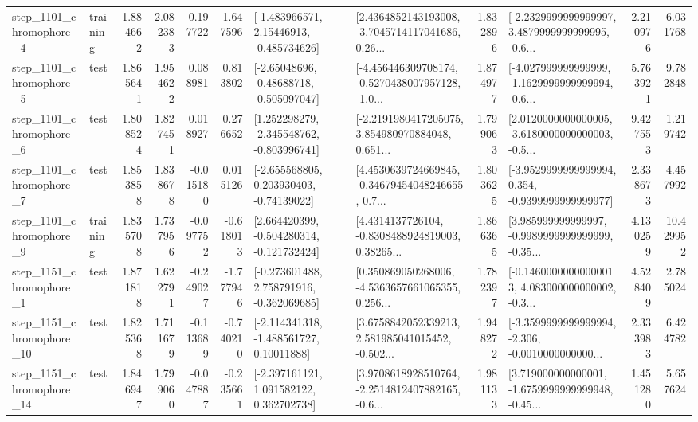 \begin{tabular}{llrrrrllrlrr}
  step\_1101\_chromophore\_4 &  training &      1.884662 &    2.082383 &      0.197722 &  1.647596 &    [-1.483966571, 2.15446913, -0.485734626] &  [2.4364852143193008, -3.7045714117041686, 0.26... &       1.832896 &  [-2.2329999999999997, 3.4879999999999995, -0.6... &            2.210976 &          6.031768 \\
  step\_1101\_chromophore\_5 &      test &      1.865641 &    1.954622 &      0.088981 &  0.813802 &    [-2.65048696, -0.48688718, -0.505097047] &  [-4.456446309708174, -0.5270438007957128, -1.0... &       1.874977 &  [-4.027999999999999, -1.1629999999999994, -0.6... &            5.763921 &          9.782848 \\
  step\_1101\_chromophore\_6 &      test &      1.808524 &    1.827451 &      0.018927 &  0.276652 &   [1.252298279, -2.345548762, -0.803996741] &  [-2.2191980417205075, 3.854980970884048, 0.651... &       1.799063 &  [2.0120000000000005, -3.6180000000000003, -0.5... &            9.427553 &          1.219742 \\
  step\_1101\_chromophore\_7 &      test &      1.853858 &    1.838678 &     -0.015180 &  0.015126 &    [-2.655568805, 0.203930403, -0.74139022] &  [4.4530639724669845, -0.34679454048246655, 0.7... &       1.803625 &  [-3.9529999999999994, 0.354, -0.9399999999999977] &            2.338673 &          4.457992 \\
  step\_1101\_chromophore\_9 &  training &      1.835708 &    1.737956 &     -0.097752 & -0.618013 &   [2.664420399, -0.504280314, -0.121732424] &  [4.4314137726104, -0.8308488924819003, 0.38265... &       1.866365 &  [3.985999999999997, -0.9989999999999999, -0.35... &            4.130259 &         10.429952 \\
  step\_1151\_chromophore\_1 &      test &      1.871818 &    1.622791 &     -0.249027 & -1.777946 &   [-0.273601488, 2.758791916, -0.362069685] &  [0.350869050268006, -4.5363657661065355, 0.256... &       1.782397 &  [-0.14600000000000013, 4.083000000000002, -0.3... &            4.528409 &          2.785024 \\
 step\_1151\_chromophore\_10 &      test &      1.825368 &    1.711679 &     -0.113689 & -0.740210 &    [-2.114341318, -1.488561727, 0.10011888] &  [3.6758842052339213, 2.581985041015452, -0.502... &       1.948272 &  [-3.3599999999999994, -2.306, -0.0010000000000... &            2.333983 &          6.424782 \\
 step\_1151\_chromophore\_14 &      test &      1.846947 &    1.799060 &     -0.047887 & -0.235661 &    [-2.397161121, 1.091582122, 0.362702738] &  [3.9708618928510764, -2.2514812407882165, -0.6... &       1.981133 &  [3.719000000000001, -1.6759999999999948, -0.45... &            1.451280 &          5.657624 \\

\end{tabular}
